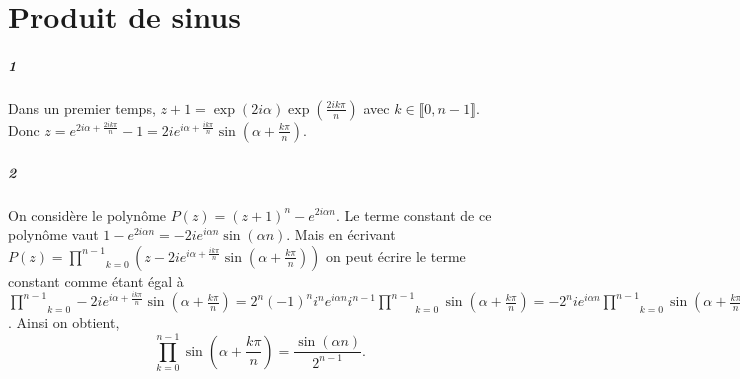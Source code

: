 \documentclass[10pt,a4paper]{article}
\begin{document}
\section{Produit de sinus}
\subparagraph{1}Dans un premier temps, $z+1 = \exp(2i\alpha) \exp(\frac{2ik\pi}{n})$ avec $k \in \llbracket 0,n-1 \rrbracket$. Donc $z = e^{2i \alpha + \frac{2ik\pi}{n}}-1 = 2ie^{i \alpha + \frac{ik\pi}{n}} \sin \left( \alpha + \frac{k\pi}{n}\right)$.
\subparagraph{2}On considère le polynôme $P(z) = (z+1)^n - e^{2i\alpha n}$. Le terme constant de ce polynôme vaut $1- e^{2i\alpha n} = -2 i e^{i \alpha n } \sin \left( \alpha n\right)$. Mais en écrivant $P(z) = \underset{k=0}{\overset{n-1}{\prod}} \left(z- 2ie^{i \alpha + \frac{ik\pi}{n}} \sin \left( \alpha + \frac{k\pi}{n}\right) \right)$ on peut écrire le terme constant comme étant égal à $\underset{k=0}{\overset{n-1}{\prod}}-2ie^{i\alpha+ \frac{ik\pi}{n}} \sin \left( \alpha+ \frac{k\pi}{n}\right) = 2^n (-1)^n i^n e^{i \alpha n } i^{n-1} \underset{k=0}{\overset{n-1}{\prod}} \sin \left( \alpha + \frac{k \pi}{n} \right) = -2^n i e^{i \alpha n } \underset{k=0}{\overset{n-1}{\prod}} \sin \left( \alpha + \frac{k \pi}{n} \right)$. Ainsi on obtient,
\begin{equation}
\underset{k=0}{\overset{n-1}{\prod}} \sin \left( \alpha + \frac{k \pi}{n} \right) = \frac{\sin(\alpha n)}{2^{n-1}}.
\end{equation}
\end{document}
